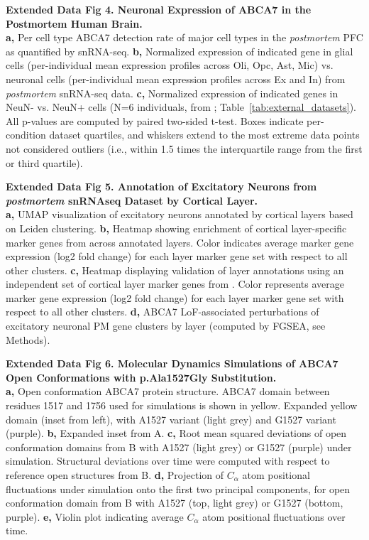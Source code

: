 \textbf{Extended Data Fig 4. Neuronal Expression of ABCA7 in the Postmortem Human Brain.}\\
\textbf{a,} Per cell type ABCA7 detection rate of major cell types in the \textit{postmortem} PFC as quantified by snRNA-seq. 
\textbf{b,} Normalized expression of indicated gene in glial cells (per-individual mean expression profiles across Oli, Opc, Ast, Mic) vs. neuronal cells (per-individual mean expression profiles across Ex and In) from \textit{postmortem} snRNA-seq data. 
\textbf{c,} Normalized expression of indicated genes in NeuN- vs. NeuN+ cells (N=6 individuals, from \supercite{Welch2022-ef}; Table~\ref{tab:external_datasets}). All p-values are computed by paired two-sided t-test. Boxes indicate per-condition dataset quartiles, and whiskers extend to the most extreme data points not considered outliers (i.e., within 1.5 times the interquartile range from the first or third quartile).

\textbf{Extended Data Fig 5. Annotation of Excitatory Neurons from \textit{postmortem} snRNAseq Dataset by Cortical Layer.}\\
\textbf{a,} UMAP visualization of excitatory neurons annotated by cortical layers based on Leiden clustering. 
\textbf{b,} Heatmap showing enrichment of cortical layer-specific marker genes from \supercite{He2017-dq} across annotated layers. Color indicates average marker gene expression (log2 fold change) for each layer marker gene set with respect to all other clusters.    
\textbf{c,} Heatmap displaying validation of layer annotations using an independent set of cortical layer marker genes from \supercite{Maynard2021-mz}. Color represents average marker gene expression (log2 fold change) for each layer marker gene set with respect to all other clusters.
\textbf{d,} ABCA7 LoF-associated perturbations of excitatory neuronal PM gene clusters by layer (computed by FGSEA, see Methods).

\textbf{Extended Data Fig 6. Molecular Dynamics Simulations of ABCA7 Open Conformations with p.Ala1527Gly Substitution.}\\
\textbf{a,} Open conformation ABCA7 protein structure. ABCA7 domain between residues 1517 and 1756 used for simulations is shown in yellow. Expanded yellow domain (inset from left), with A1527 variant (light grey) and G1527 variant (purple). 
\textbf{b,} Expanded inset from A. 
\textbf{c,} Root mean squared deviations of open conformation domains from B with A1527 (light grey) or G1527 (purple) under simulation. Structural deviations over time were computed with respect to reference open structures from B. 
\textbf{d,} Projection of $C_\alpha$ atom positional fluctuations under simulation onto the first two principal components, for open conformation domain from B with A1527 (top, light grey) or G1527 (bottom, purple). 
\textbf{e,} Violin plot indicating average $C_\alpha$ atom positional fluctuations over time. 

